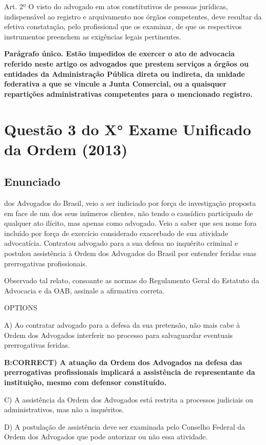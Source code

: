 \documentclass[12pt]{article}
\begin{document}
Art. 2º O visto do advogado em atos constitutivos de pessoas jurídicas, indispensável ao registro e arquivamento nos órgãos competentes, deve resultar da efetiva constatação, pelo profissional que os examinar, de que os respectivos instrumentos preenchem as exigências legais pertinentes. 

\textbf{Parágrafo único. Estão impedidos de exercer o ato de advocacia referido neste artigo os advogados que  prestem  serviços  a  órgãos  ou  entidades  da  Administração  Pública  direta  ou  indireta,  da 
unidade federativa a que se vincule a Junta Comercial, ou a quaisquer repartições administrativas competentes para o mencionado registro. }


\section{Questão 3 do X° Exame Unificado da Ordem (2013)}

\subsection{Enunciado}

dos Advogados do Brasil, veio a ser indiciado por força de 
investigação proposta em face de um dos seus inúmeros 
clientes, não tendo o causídico participado de qualquer ato 
ilícito, mas apenas como advogado. Veio a saber que seu 
nome fora incluído por força de exercício considerado 
exacerbado de sua atividade advocatícia. Contratou advogado 
para a sua defesa no inquérito criminal e postulou assistência 
à Ordem dos Advogados do Brasil por entender feridas suas 
prerrogativas profissionais.  
 
Observado tal relato, consoante as normas do Regulamento 
Geral do Estatuto da Advocacia e da OAB, assinale a afirmativa 
correta. 
 
OPTIONS

A) Ao contratar advogado para a defesa da sua pretensão, 
não mais cabe à Ordem dos Advogados interferir no 
processo para salvaguardar eventuais prerrogativas 
feridas. 

\textbf{B:CORRECT) A atuação da Ordem dos Advogados na defesa das 
prerrogativas profissionais implicará a assistência de 
representante da instituição, mesmo com defensor 
constituído. }

C) A assistência da Ordem dos Advogados está restrita a 
processos judiciais ou administrativos, mas não a 
inquéritos. 

D) A postulação de assistência deve ser examinada pelo 
Conselho Federal da Ordem dos Advogados que pode 
autorizar ou não essa atividade. 
\end{document}
